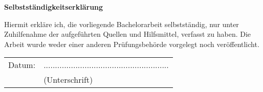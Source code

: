 



\makeindex
{}


	\frontmatter

	
	
	\mainmatter
	
	\renewcommand{\baselinestretch}{1.05}
	\small\normalsize

	
	
	
	
	

	\appendix
	
	

	\backmatter
	


\newpage
\thispagestyle{empty}
\begin{center}
	\vspace*{5em}
	\huge\textbf{Selbstständigkeitserklärung}\\
\end{center}
\vspace{2em}
Hiermit erkläre ich, die vorliegende Bachelorarbeit selbstständig, nur unter Zuhilfenahme der aufgeführten Quellen und Hilfsmittel, verfasst zu haben.
Die Arbeit wurde weder einer anderen Prüfungsbehörde vorgelegt noch veröffentlicht.

\vspace{4em}
\begin{minipage}{\linewidth}
	\begin{tabular}{p{15em}p{15em}}
		Datum: &  .......................................................\\
		& \centering (Unterschrift)\\
	\end{tabular}
\end{minipage}



         
